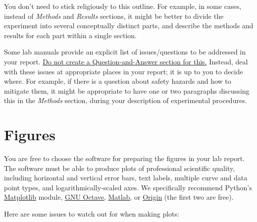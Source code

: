 \documentclass[11pt,a4paper]{article}
\begin{document}
\noindent
You don't need to stick religiously to this outline.  For example, in
some cases, instead of \textit{Methods} and \textit{Results} sections,
it might be better to divide the experiment into several conceptually
distinct parts, and describe the methods and results for each part
within a single section.

Some lab manuals provide an explicit list of issues/questions to be
addressed in your report.  \underline{Do not create a
  Question-and-Answer section for this.}  Instead, deal with these
issues at appropriate places in your report; it is up to you to decide
where.  For example, if there is a question about safety hazards and
how to mitigate them, it might be appropriate to have one or two
paragraphs discussing this in the \textit{Methods} section, during
your description of experimental procedures.

\section{Figures}

You are free to choose the software for preparing the figures in your
lab report.  The software must be able to produce plots of
professional scientific quality, including horizontal and vertical
error bars, text labels, multiple curve and data point types, and
logarithmically-scaled axes.  We specifically recommend Python's
\href{https://matplotlib.org/}{Matplotlib} module,
\href{https://www.gnu.org/software/octave/}{GNU Octave},
\href{https://www.mathworks.com/products/matlab.html}{Matlab}, or
\href{https://www.originlab.com/}{Origin} (the first two are free).

Here are some issues to watch out for when making plots:
\end{document}
